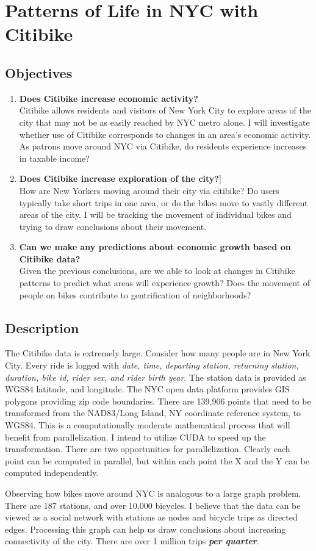 \documentclass{article}
\begin{document}
\section*{Patterns of Life in NYC with Citibike}
\subsection*{Objectives}
\begin{enumerate}
\item \textbf{Does Citibike increase economic activity?}\\
Citibike allows residents and visitors of New York City to explore areas of the city that may not be as easily reached by NYC metro alone. I will investigate whether use of Citibike corresponds to changes in an area's economic activity. As patrons move around NYC via Citibike, do residents experience increases in taxable income?
\item \textbf{Does Citibike increase exploration of the city?}]\\
How are New Yorkers moving around their city via citibike? Do users typically take short trips in one area, or do the bikes move to vastly different areas of the city. I will be tracking the movement of individual bikes and trying to draw conclusions about their movement.
\item \textbf{Can we make any predictions about economic growth based on Citibike data?}\\
Given the previous conclusions, are we able to look at changes in Citibike patterns to predict what areas will experience growth? Does the movement of people on bikes contribute to gentrification of neighborhoods?
\end{enumerate}
\subsection*{Description}
The Citibike data is extremely large. Consider how many people are in New York City. Every ride is logged with \textit{date, time, departing station, returning station, duration, bike id, rider sex, and rider birth year}. The station data is provided as WGS84 latitude, and longitude. The NYC open data platform provides GIS polygons providing zip code boundaries. There are 139,906 points that need to be transformed from the NAD83/Long Island, NY coordinate reference system, to WGS84. This is a computationally moderate mathematical process that will benefit from parallelization. I intend to utilize CUDA to speed up the transformation. There are two opportunities for parallelization. Clearly each point can be computed in parallel, but within each point the X and the Y can be computed independently.\par
Observing how bikes move around NYC is analogous to a large graph problem. There are 187 stations, and over 10,000 bicycles. I believe that the data can be viewed as a social network with stations as nodes and bicycle trips as directed edges. Processing this graph can help us draw conclusions about increasing connectivity of the city. There are over 1 million trips \textbf{\textit{per quarter}}.
\end{document}
